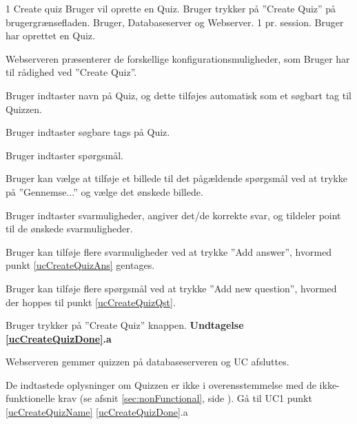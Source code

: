 
\uchead
	{1}
	{Create quiz}
	{Bruger vil oprette en Quiz.}
	{Bruger trykker på ''Create Quiz'' på brugergrænsefladen.}
	{Bruger, Databaseserver og Webserver.}
	{}
	{1 pr. session.}
	{Bruger har oprettet en Quiz.}

\item Webserveren præsenterer de forskellige konfigurationsmuligheder, som Bruger har til rådighed ved ''Create Quiz''.

\item \label{ucCreateQuizName} Bruger indtaster navn på Quiz, og dette tilføjes automatisk som et søgbart tag til Quizzen.

\item Bruger indtaster søgbare tags på Quiz.

\item \label{ucCreateQuizQst} Bruger indtaster spørgsmål.

\item Bruger kan vælge at tilføje et billede til det pågældende spørgsmål ved at trykke på ''Gennemse...'' og vælge det ønskede billede.

\item \label{ucCreateQuizAns} Bruger indtaster svarmuligheder, angiver det/de korrekte svar, og tildeler point til de ønskede svarmuligheder.

\item Bruger kan tilføje flere svarmuligheder ved at trykke ''Add answer'', hvormed punkt \ref{ucCreateQuizAns} gentages.

\item Bruger kan tilføje flere spørgsmål ved at trykke ''Add new question'', hvormed der hoppes til punkt \ref{ucCreateQuizQst}.

\item \label{ucCreateQuizDone} Bruger trykker på ''Create Quiz'' knappen.
\textbf{Undtagelse \ref{ucCreateQuizDone}.a}

\item \label{ucCreateQuizDB} Webserveren gemmer quizzen på databaseserveren og UC afsluttes.

\ucdescriptionend

\ucextension
	{De indtastede oplysninger om Quizzen er ikke i overensstemmelse med de ikke-funktionelle krav (se afsnit \ref{sec:nonFunctional}, side \pageref{sec:nonFunctional}).}
	{Gå til UC1 punkt \ref{ucCreateQuizName}}
	{\ref{ucCreateQuizDone}.a}
		
